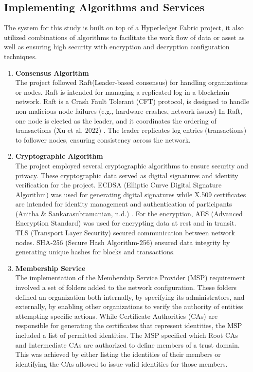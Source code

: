 \subsection{Implementing Algorithms and Services}
The system for this study is built on top of a Hyperledger Fabric project, it also utilized combinations of algorithms to facilitate the work flow of data or asset as well as ensuring high security with encryption and decryption configuration techniques. 
\begin{enumerate}
	\item \textbf{Consensus Algorithm} \\The project followed Raft(Leader-based consensus) for handling organizations or nodes. Raft is intended for managing a replicated log in a blockchain network. Raft is a Crash Fault Tolerant (CFT) protocol, is designed to handle non-malicious node failures (e.g., hardware crashes, network issues) In Raft, one node is elected as the leader, and it coordinates the ordering of transactions (Xu et al, 2022) \nocite{method-1}. The leader replicates log entries (transactions) to follower nodes, ensuring consistency across the network. 
	
	\item \textbf{Cryptographic Algorithm} \\The project employed several cryptographic algorithms to ensure security and privacy. These cryptographic data served as digital signatures and identity verification for the project. ECDSA (Elliptic Curve Digital Signature Algorithm) was used for generating digital signatures while X.509 certificates are intended for identity management and authentication of participants (Anitha \& Sankarasubramanian, n.d.) \nocite{method-2}. For the encryption, AES (Advanced Encryption Standard) was used for encrypting data at rest and in transit. TLS (Transport Layer Security) secured communication between network nodes. SHA-256 (Secure Hash Algorithm-256) ensured data integrity by generating unique hashes for blocks and transactions.
	
	\item \textbf{Membership Service} \\The implementation of the Membership Service Provider (MSP) requirement involved a set of folders added to the network configuration. These folders defined an organization both internally, by specifying its administrators, and externally, by enabling other organizations to verify the authority of entities attempting specific actions. While Certificate Authorities (CAs) are responsible for generating the certificates that represent identities, the MSP included a list of permitted identities. The MSP specified which Root CAs and Intermediate CAs are authorized to define members of a trust domain. This was achieved by either listing the identities of their members or identifying the CAs allowed to issue valid identities for those members.
	

\end{enumerate}
